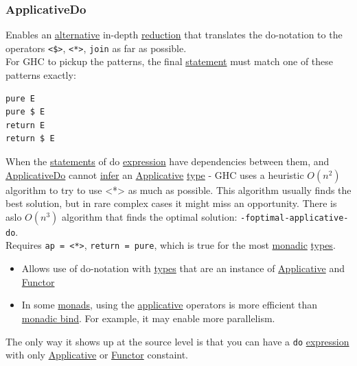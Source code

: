 \documentclass[a4paper,14pt,oneside]{book}
\begin{document}
\subsubsection{\label{orgec558c0}ApplicativeDo}
\label{sec:orge23cd25}
Enables an \hyperref[orgb0e4eb4]{alternative} in-depth \hyperref[org742c6b3]{reduction} that translates the do-notation to the operators \texttt{<\$>}, \texttt{<*>}, \texttt{join} as far as possible.\\

For GHC to pickup the patterns, the final \hyperref[org722f075]{statement} must match one of these patterns exactly:\\

\begin{verbatim}
pure E
pure $ E
return E
return $ E
\end{verbatim}

When the \hyperref[org1db31d8]{statements} of do \hyperref[org6aa6989]{expression} have dependencies between them, and \hyperref[orgec558c0]{ApplicativeDo} cannot \hyperref[org4ee69cd]{infer} an \hyperref[org7918dd8]{Applicative} \hyperref[orgd6db20c]{type} - GHC uses a heuristic \(O(n^2)\) algorithm to try to use <*> as much as possible. This algorithm usually finds the best solution, but in rare complex cases it might miss an opportunity. There is aslo \(O(n^3)\) algorithm that finds the optimal solution: \texttt{-foptimal-applicative-do}.\\

Requires \texttt{ap = <*>}, \texttt{return = pure}, which is true for the most \hyperref[orgaaf7f99]{monadic} \hyperref[org9e7edc9]{types}.\\
\begin{itemize}
\item Allows use of do-notation with \hyperref[org9e7edc9]{types} that are an instance of \hyperref[org7918dd8]{Applicative} and \hyperref[orge5e236e]{Functor}\\
\item In some \hyperref[org62af8bb]{monads}, using the \hyperref[org7918dd8]{applicative} operators is more efficient than \hyperref[org53872d9]{monadic bind}. For example, it may enable more parallelism.\\
\end{itemize}

The only way it shows up at the source level is that you can have a \texttt{do} \hyperref[org6aa6989]{expression} with only \hyperref[org7918dd8]{Applicative} or \hyperref[orge5e236e]{Functor} constaint.\\
\end{document}
